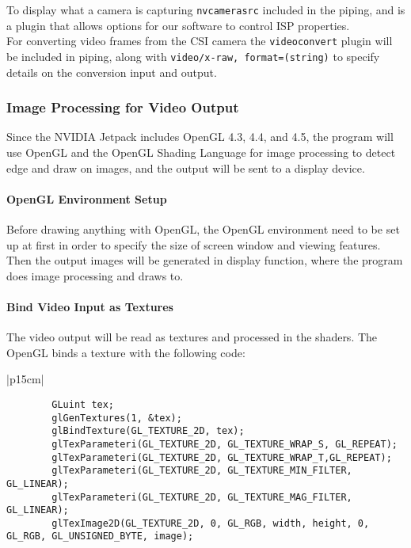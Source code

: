 To display what a camera is capturing \texttt{nvcamerasrc} included in the piping, 
and is a plugin that allows options for our software to control ISP properties. \\

For converting video frames from the CSI camera the \texttt{videoconvert} plugin will 
be included in piping, along with \texttt{video/x-raw, format=(string){}} to specify 
details on the conversion input and output. \\

\subsubsection{Image Processing for Video Output}

Since the  NVIDIA Jetpack includes OpenGL 4.3, 4.4, and 4.5, the program will use 
OpenGL and the OpenGL Shading Language for image processing to detect edge and draw on 
images, and the output will be sent to a display device. \\

\paragraph{OpenGL Environment Setup}

Before drawing anything with OpenGL, the OpenGL environment need to be set up at first 
in order to specify the size of screen window and viewing features. Then the output 
images will be generated in display function, where the program does image processing 
and draws to. \\

\paragraph{Bind Video Input as Textures}

The video output will be read as textures and processed in the shaders. The OpenGL 
binds a texture with the following code:\\

\begin{tabular}{|p{15cm}|}
	\begin{lstlisting}
		GLuint tex;
		glGenTextures(1, &tex);
		glBindTexture(GL_TEXTURE_2D, tex);
		glTexParameteri(GL_TEXTURE_2D, GL_TEXTURE_WRAP_S, GL_REPEAT);
		glTexParameteri(GL_TEXTURE_2D, GL_TEXTURE_WRAP_T,GL_REPEAT);
		glTexParameteri(GL_TEXTURE_2D, GL_TEXTURE_MIN_FILTER, GL_LINEAR);
		glTexParameteri(GL_TEXTURE_2D, GL_TEXTURE_MAG_FILTER, GL_LINEAR);
		glTexImage2D(GL_TEXTURE_2D, 0, GL_RGB, width, height, 0, GL_RGB, GL_UNSIGNED_BYTE, image);
	\end{lstlisting}
\end{tabular}

